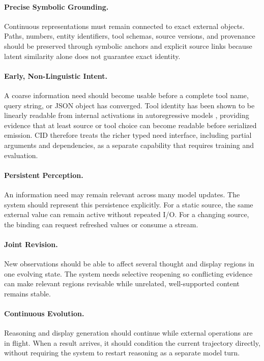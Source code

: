 \paragraph{Precise Symbolic Grounding.}
Continuous representations must remain connected to exact external objects. Paths, numbers, entity identifiers, tool schemas, source versions, and provenance should be preserved through symbolic anchors and explicit source links because latent similarity alone does not guarantee exact identity.

\paragraph{Early, Non-Linguistic Intent.}
A coarse information need should become usable before a complete tool name, query string, or JSON object has converged. Tool identity has been shown to be linearly readable from internal activations in autoregressive models \citep{wu2026toolreadable}, providing evidence that at least source or tool choice can become readable before serialized emission. CID therefore treats the richer typed need interface, including partial arguments and dependencies, as a separate capability that requires training and evaluation.

\paragraph{Persistent Perception.}
An information need may remain relevant across many model updates. The system should represent this persistence explicitly. For a static source, the same external value can remain active without repeated I/O. For a changing source, the binding can request refreshed values or consume a stream.

\paragraph{Joint Revision.}
New observations should be able to affect several thought and display regions in one evolving state. The system needs selective reopening so conflicting evidence can make relevant regions revisable while unrelated, well-supported content remains stable.

\paragraph{Continuous Evolution.}
Reasoning and display generation should continue while external operations are in flight. When a result arrives, it should condition the current trajectory directly, without requiring the system to restart reasoning as a separate model turn.
